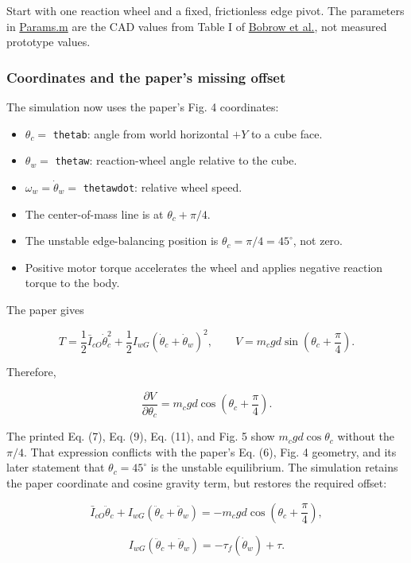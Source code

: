 \documentclass[
]{article}
\providecommand{\tightlist}{%
  \setlength{\itemsep}{0pt}\setlength{\parskip}{0pt}}
\begin{document}
Start with one reaction wheel and a fixed, frictionless edge pivot. The
parameters in \href{Matlab\%20sim/Params.m}{Params.m} are the CAD values
from Table I of
\href{Ref/lagrange\%20cubli\%20\%26\%20complex\%20formation.pdf}{Bobrow
et al.}, not measured prototype values.

\subsubsection{Coordinates and the paper's missing
offset}\label{coordinates-and-the-papers-missing-offset}

The simulation now uses the paper's Fig. 4 coordinates:

\begin{itemize}
\tightlist
\item
  \(\theta_c=\) \texttt{thetab}: angle from world horizontal \(+Y\) to a
  cube face.
\item
  \(\theta_w=\) \texttt{thetaw}: reaction-wheel angle relative to the
  cube.
\item
  \(\omega_w=\dot\theta_w=\) \texttt{thetawdot}: relative wheel speed.
\item
  The center-of-mass line is at \(\theta_c+\pi/4\).
\item
  The unstable edge-balancing position is \(\theta_c=\pi/4=45^\circ\),
  not zero.
\item
  Positive motor torque accelerates the wheel and applies negative
  reaction torque to the body.
\end{itemize}

The paper gives

\[T=\frac12\bar I_{cO}\dot\theta_c^2+
  \frac12 I_{wG}(\dot\theta_c+\dot\theta_w)^2,
\qquad
V=m_cgd\sin\left(\theta_c+\frac{\pi}{4}\right).\]

Therefore,

\[\frac{\partial V}{\partial\theta_c}
=m_cgd\cos\left(\theta_c+\frac{\pi}{4}\right).\]

The printed Eq. (7), Eq. (9), Eq. (11), and Fig. 5 show
\(m_cgd\cos\theta_c\) without the \(\pi/4\). That expression conflicts
with the paper's Eq. (6), Fig. 4 geometry, and its later statement that
\(\theta_c=45^\circ\) is the unstable equilibrium. The simulation
retains the paper coordinate and cosine gravity term, but restores the
required offset:

\[\bar I_{cO}\ddot\theta_c+
I_{wG}(\ddot\theta_c+\ddot\theta_w)
=-m_cgd\cos\left(\theta_c+\frac{\pi}{4}\right),\]

\[I_{wG}(\ddot\theta_c+\ddot\theta_w)
=-\tau_f(\dot\theta_w)+\tau.\]
\end{document}
